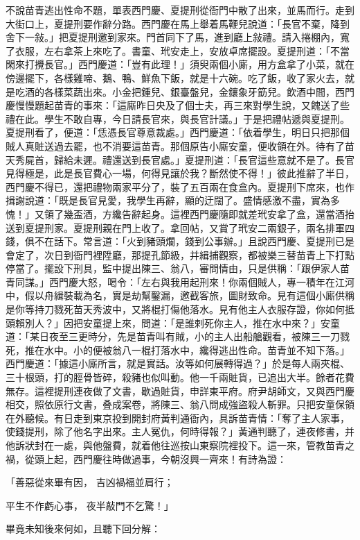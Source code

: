 不說苗青逃出性命不題，單表西門慶、夏提刑從衙門中散了出來，並馬而行。走到大街口上，夏提刑要作辭分路。西門慶在馬上舉着馬鞭兒說道：「長官不棄，降到舍下一敍。」把夏提刑邀到家來。門首同下了馬，進到廳上敍禮。請入捲棚內，寬了衣服，左右拿茶上來吃了。書童、玳安走上，安放卓席擺設。夏提刑道：「不當閑來打攪長官。」西門慶道：「豈有此理！」須臾兩個小廝，用方盒拿了小菜，就在傍邊擺下，各樣雞啼、鵝、鴨、鮮魚下飯，就是十六碗。吃了飯，收了家火去，就是吃酒的各樣菜蔬出來。小金把鍾兒、銀臺盤兒，金鑲象牙筯兒。飲酒中間，西門慶慢慢題起苗青的事來：「這廝昨日央及了個士夫，再三來對學生說，又餽送了些禮在此。學生不敢自專，今日請長官來，與長官計議。」于是把禮帖遞與夏提刑。夏提刑看了，便道：「恁憑長官尊意裁處。」西門慶道：「依着學生，明日只把那個賊人真賍送過去罷，也不消要這苗青。那個原告小廝安童，便收領在外。待有了苗天秀屍首，歸給未遲。禮還送到長官處。」夏提刑道：「長官這些意就不是了。長官見得極是，此是長官費心一場，何得見讓於我？斷然使不得！」彼此推辭了半日，西門慶不得已，還把禮物兩家平分了，裝了五百兩在食盒內。夏提刑下席來，也作揖謝說道：「既是長官見愛，我學生再辭，顯的迂闊了。盛情感激不盡，實為多愧！」又領了幾盃酒，方纔告辭起身。這裡西門慶隨即就差玳安拿了盒，還當酒抬送到夏提刑家。夏提刑親在門上收了。拿回帖，又賞了玳安二兩銀子，兩名排軍四錢，俱不在話下。常言道：「火到豬頭爛，錢到公事辦。」且說西門慶、夏提刑已是會定了，次日到衙門裡陞廳，那提孔節級，并緝捕觀察，都被樂三替苗青上下打點停當了。擺設下刑具，監中提出陳三、翁八，審問情由，只是供稱：「跟伊家人苗青同謀。」西門慶大怒，喝令：「左右與我用起刑來！你兩個賊人，專一積年在江河中，假以舟緝裝載為名，實是劫幫鑿漏，邀截客旅，圖財致命。見有這個小廝供稱是你等持刀戮死苗天秀波中，又將棍打傷他落水。見有他主人衣服存證，你如何抵頭賴別人？」因把安童提上來，問道：「是誰剌死你主人，推在水中來？」安童道：「某日夜至三更時分，先是苗青叫有賊，小的主人出船艙觀看，被陳三一刀戮死，推在水中。小的便被翁八一棍打落水中，纔得逃出性命。苗青並不知下落。」西門慶道：「據這小廝所言，就是實話。汝等如何展轉得過？」於是每人兩夾棍、三十根頭，打的脛骨皆碎，殺豬也似叫動。他一千兩賍貨，已追出大半。餘者花費無存。這裡提刑連夜做了文書，歇過賍貨，申詳東平府。府尹胡師文，又與西門慶相交，照依原行文書，叠成案卷，將陳三、翁八問成強盜殺人斬罪。只把安童保領在外聽候。有日走到東京投到開封府黃判通衙內，具訴苗青情：「奪了主人家事，使錢提刑，除了他名字出來。主人冤仇，何時得報？」黃通判聽了，連夜修書，并他訴狀封在一處，與他盤費，就着他往巡按山東察院裡投下。這一來，管教苗青之禍，從頭上起，西門慶往時做過事，今朝沒興一齊來！有詩為證：

「善惡從來畢有因，  吉凶禍福並肩行；

平生不作虧心事，  夜半敲門不乞驚！」

畢竟未知後來何如，且聽下回分解：
